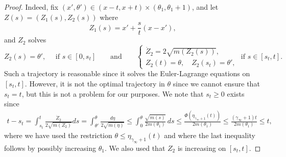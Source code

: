 \documentclass[11pt]{article}    %
\begin{document}
\begin{proof}

Indeed, fix $(x',\theta')\in (x-t,x+t)\times(\theta_1,\theta_1+1)$, and let $Z(s) = (Z_1(s), Z_2(s))$ where 
\begin{equation*}
Z_1(s) = x' +\frac{s}{t}(x-x'),
\end{equation*}
and $Z_2$ solves 
\begin{equation*}
Z_2(s) = \theta', \quad \text{ if } s \in [0,s_t]
\qquad \text{and} \qquad
\begin{cases}
\dot Z_2 =  2 \sqrt{m(Z_2(s))},\\
Z_2(t)=\theta, \quad Z_2(s_t) = \theta',
\end{cases}
\text{ if } s\in[s_t,t].
\end{equation*}
Such a trajectory is reasonable since it solves the Euler-Lagrange equations on $[s_t,t]$. However, it is not the optimal trajectory in $\theta$ since we cannot ensure that $s_t = t$, but this is not a problem for our purposes. %
We note that $s_t\geq 0$ exists since
\begin{equation}
\begin{split}
	t-s_t = \int_{s_t}^t \frac{\dot Z_2}{2\sqrt{m(Z_2)}} ds 
		= \int_{\theta'}^\theta \frac{d\eta}{2\sqrt{m(\eta)}}
		\leq\int_{0}^\theta \frac{\sqrt{m(s)} }{2m(\theta_1)} \, ds
		\leq \frac{\Phi(\eta_{\gamma_\infty+1}(t))}{2 m(\theta_1)} \leq \frac{(\gamma_\infty+1)t}{2m(\theta_1)} \leq t,
\end{split}
\end{equation}
where we have used the restriction $\theta \leq \eta_{\gamma_\infty+1}(t)$ and where the last inequality follows by possibly increasing $\theta_1$.
We also used that $Z_2$ is increasing on $[s_t,t]$.


\end{proof}
\end{document}
